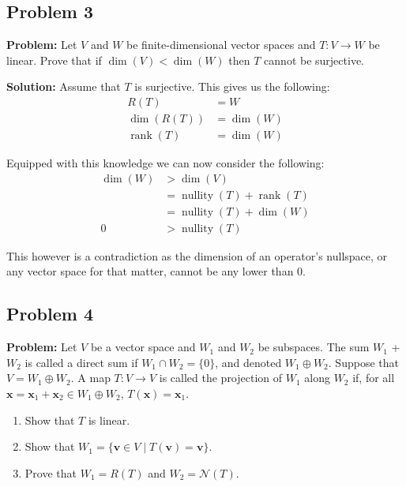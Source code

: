 \documentclass{article}
\renewcommand\vec{\mathbf}
\begin{document}
\subsection*{Problem 3} 
\noindent\textbf{Problem:} Let $V$ and $W$ be finite-dimensional vector spaces and $T:V\to W$ be linear. Prove that if $\operatorname{dim}(V)<\operatorname{dim}(W)$ then $T$ cannot be surjective.
\bigskip

\noindent\textbf{Solution:} Assume that $T$ is surjective. This gives us the following:
\begin{align*}
  R(T)&=W\tag{def. of surjective}\\
  \operatorname{dim}(R(T))&=\operatorname{dim}(W)\\
  \operatorname{rank}(T)&=\operatorname{dim}(W)\tag{def. of rank}
\end{align*}

Equipped with this knowledge we can now consider the following:
\begin{align*}
  \operatorname{dim}(W)&>\operatorname{dim}(V)\\
  &=\operatorname{nullity}(T)+\operatorname{rank}(T)\tag{dimension theorem}\\
  &=\operatorname{nullity}(T)+\operatorname{dim}(W)\tag{above reasoning}\\
  0&>\operatorname{nullity}(T)
\end{align*}

This however is a contradiction as the dimension of an operator's nullspace, or any vector space for that matter, cannot be any lower than 0.

\subsection*{Problem 4} 
\noindent\textbf{Problem:} Let $V$ be a vector space and $W_1$ and $W_2$ be subspaces. The sum $W_1$ + $W_2$ is called a direct sum if $W_1\cap W_2 = \{0\}$, and denoted $W_1\oplus W_2$. Suppose that $V = W_1\oplus W_2$. A map
$T:V\to V$ is called the projection of $W_1$ along $W_2$ if, for all $\vec x = \vec x_1 + \vec x_2\in W_1\oplus W_2$, $T(\vec x) = \vec x_1$.
\begin{enumerate}[label=\textbf{\alph*)}]
    \item Show that $T$ is linear.
    \item Show that $W_1 = \{\vec v\in V\mid T(\vec v) = \vec v\}$.
    \item Prove that $W_1 = R(T)$ and $W_2 = \mathcal N(T)$.
\end{enumerate}
\bigskip
\pagebreak
\end{document}
